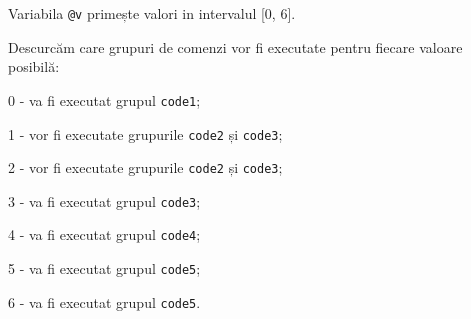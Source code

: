 Variabila \texttt{@v} primește valori in intervalul [0, 6].

Descurcăm care grupuri de comenzi vor fi executate pentru fiecare valoare posibilă:
\begin{icItems}
	\item 0 - va fi executat grupul \texttt{code1};
	\item 1 - vor fi executate grupurile \texttt{code2} și \texttt{code3};
	\item 2 - vor fi executate grupurile \texttt{code2} și \texttt{code3};
	\item 3 - va fi executat grupul \texttt{code3};
	\item 4 - va fi executat grupul \texttt{code4};
	\item 5 - va fi executat grupul \texttt{code5};
	\item 6 - va fi executat grupul \texttt{code5}.
\end{icItems}


